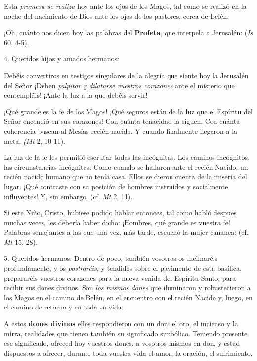 Esta \emph{promesa se realiza} hoy ante los ojos de los Magos, tal como se realizó en la noche del nacimiento de Dios ante los ojos de los pastores, cerca de Belén.

¡Oh, cuánto nos dicen hoy las palabras del \textbf{Profeta}, que interpela a Jerusalén:  (\emph{Is} 60, 4-5).

4. Queridos hijos y amados hermanos:

Debéis convertiros en testigos singulares de la alegría que siente hoy la Jerusalén del Señor ¡Deben \emph{palpitar y dilatarse vuestros corazones} ante el misterio que contempláis! ¡Ante la luz a la que debéis servir!

¡Qué grande es la fe de los Magos! ¡Qué seguros están de la luz que el Espíritu del Señor encendió en sus corazones! Con cuánta tenacidad la siguen. Con cuánta coherencia buscan al Mesías recién nacido. Y cuando finalmente llegaron a la meta,  \emph{(Mt} 2, 10-11).

La luz de la fe les permitió escrutar todas las incógnitas. Los caminos incógnitos. las circunstancias incógnitas. Como cuando se hallaron ante el recién Nacido, un recién nacido humano que no tenía casa. Ellos se dieron cuenta de la miseria del lugar. ¡Qué contraste con su posición de hombres instruidos y socialmente influyentes! Y, sin embargo,  (cf. \emph{Mt} 2, 11).

Si este Niño, Cristo, hubiese podido hablar entonces, tal como habló después muchas veces, les debería haber dicho: ¡Hombres, qué grande es vuestra fe! Palabras semejantes a las que una vez, más tarde, escuchó la mujer cananea:  (cf. \emph{Mt} 15, 28).

5. Queridos hermanos: Dentro de poco, también vosotros os inclinaréis profundamente, y os \emph{postraréis,} y tendidos sobre el pavimento de esta basílica, prepararéis vuestros corazones para la nueva venida del Espíritu Santo, para recibir sus dones divinos. Son \emph{los mismos dones} que iluminaron y robustecieron a los Magos en el camino de Belén, en el encuentro con el recién Nacido y, luego, en el camino de retorno y en toda su vida.

A estos \textbf{dones divinos} ellos respondieron con un don: el oro, el incienso y la mirra, realidades que tienen también su significado simbólico. Teniendo presente ese significado, ofreced hoy vuestros dones, a vosotros mismos en don, y estad dispuestos a ofrecer, durante toda vuestra vida el amor, la oración, el sufrimiento.

